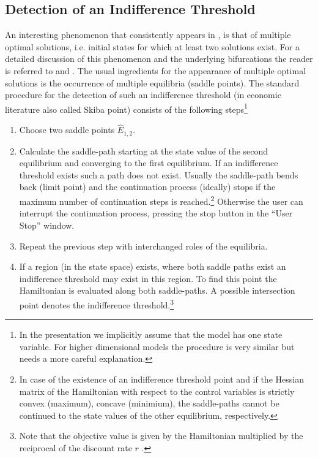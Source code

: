 \subsection{Detection of an Indifference Threshold}
\label{sec:numanalysis_detindthr}
An interesting phenomenon that consistently appears in \OCPRO, is that of multiple optimal solutions, i.e. initial states for which at least two solutions exist. For a detailed discussion of this phenomenon and the underlying bifurcations the reader is referred to \citet{grassetal2008,kiselevawagener2008a} and \citet{kiseleva2011}. The usual ingredients for the appearance of multiple optimal solutions is the occurrence of multiple equilibria (saddle points). The standard procedure  for the detection of such an indifference threshold (in economic literature also called Skiba point) consists of the following steps\footnote{In the presentation we implicitly assume that the model has one state variable. For higher dimensional models the procedure is very similar but needs a more careful explanation.}
\begin{enumerate}
	\item Choose two saddle points $\hat E_{1,2}$.
	\item Calculate the saddle-path starting at the state value of the second equilibrium and converging to the first equilibrium. If an indifference threshold exists such a path does not exist. Usually the saddle-path bends back (limit point) and the continuation process (ideally) stops if the maximum number of continuation steps is reached.\footnote{In case of the existence of an indifference threshold point and if the Hessian matrix of the Hamiltonian with respect to the control variables is strictly convex (maximum), concave (minimium), the saddle-paths cannot be continued to the state values of the other equilibrium, respectively.} Otherwise the user can interrupt the continuation process, pressing the stop button in the ``User Stop'' window.
	\item Repeat the previous step with interchanged roles of the equilibria.
	\item If a region (in the state space) exists, where both saddle paths exist an indifference threshold may exist in this region. To find this point the Hamiltonian is evaluated along both saddle-paths. A possible intersection point denotes the indifference threshold.\footnote{Note that the objective value is given by the Hamiltonian multiplied by the reciprocal of the discount rate $r$ \citep{michel1982}.}
\end{enumerate}
